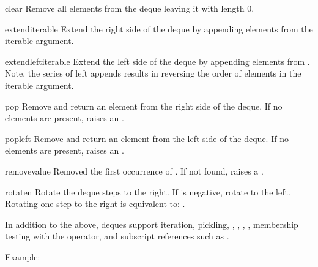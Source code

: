 \begin{methoddesc}{clear}{}
   Remove all elements from the deque leaving it with length 0.
\end{methoddesc}

\begin{methoddesc}{extend}{iterable}
   Extend the right side of the deque by appending elements from
   the iterable argument.
\end{methoddesc}

\begin{methoddesc}{extendleft}{iterable}
   Extend the left side of the deque by appending elements from
   .  Note, the series of left appends results in
   reversing the order of elements in the iterable argument.
\end{methoddesc}

\begin{methoddesc}{pop}{}
   Remove and return an element from the right side of the deque.
   If no elements are present, raises an .
\end{methoddesc}

\begin{methoddesc}{popleft}{}
   Remove and return an element from the left side of the deque.
   If no elements are present, raises an .   
\end{methoddesc}

\begin{methoddesc}{remove}{value}
   Removed the first occurrence of .  If not found,
   raises a .
\end{methoddesc}

\begin{methoddesc}{rotate}{n}
   Rotate the deque  steps to the right.  If  is
   negative, rotate to the left.  Rotating one step to the right
   is equivalent to:  . 
\end{methoddesc}

In addition to the above, deques support iteration, pickling, ,
, , ,
membership testing with the  operator, and subscript references
such as .

Example:

